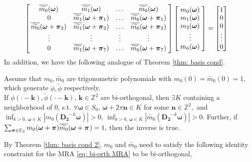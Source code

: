 \begin{align}\label{eq: LS-new}
\begin{bmatrix}
    \,\overline{\widetilde{m_{0}}}(\boldsymbol{\omega}) & \overline{\widetilde{m_{1}}}(\boldsymbol{\omega}) & \hdots & \overline{\widetilde{m_{6}}}(\boldsymbol{\omega})\;  \\
    \;0 & \overline{\widetilde{m_{1}}}(\boldsymbol{\omega} + \boldsymbol{\pi}_{1})  & \hdots  & \overline{\widetilde{m_{6}}}(\boldsymbol{\omega} + \boldsymbol{\pi}_{1})\; \\
    \,\overline{\widetilde{m_{0}}}(\boldsymbol{\omega} + \boldsymbol{\pi}_{2}) & \overline{\widetilde{m_{1}}}(\boldsymbol{\omega} + \boldsymbol{\pi}_{2}) & \hdots & \overline{\widetilde{m_{6}}}(\boldsymbol{\omega} + \boldsymbol{\pi}_{2})\;\\
    \;\vdots & \vdots & \vdots & \vdots \; \\
    \;0 & \overline{\widetilde{m_{1}}}(\boldsymbol{\omega} + \boldsymbol{\pi}_{7}) & \hdots & \overline{\widetilde{m_{6}}}(\boldsymbol{\omega} + \boldsymbol{\pi}_{7})\;
\end{bmatrix}
\begin{bmatrix}
\;m_{0}(\boldsymbol{\omega})\; \\
\;m_{1}(\boldsymbol{\omega})\; \\
\;m_{2}(\boldsymbol{\omega})\; \\
\; \vdots\; \\
\;m_{6}(\boldsymbol{\omega})\; 
\end{bmatrix} 
=
\begin{bmatrix}
1\\
0\\
0\\
\vdots \\
0
\end{bmatrix}
\end{align}
In addition, we have the following analogue of Theorem \ref{thm: basis cond}.
\begin{thm}\label{thm: basis cond 2}
Assume that $m_0, \widetilde{m_0}$ are trigonometric polynomials with $m_0(0)=\widetilde{m_0}(0) = 1$, which generate $\phi,\widetilde{\phi}$ respectively.\\
If $\phi(\cdot - \boldsymbol{k}),\widetilde{\phi}(\cdot - \boldsymbol{k}),\,\boldsymbol{k}\in\mathbb{Z}^2$ are bi-orthogonal, then $\exists K$ containing a neighborhood of 0, s.t. $\forall\boldsymbol{\omega}\in S_0,\,\boldsymbol{\omega}+2\pi\mathbf{n}\in K$ for some $\mathbf{n}\in\mathbb{Z}^2, $ and $\inf_{k>0,\,\boldsymbol{\omega}\in K}|m_0(\mathbf{D_2}^{-k}\boldsymbol{\omega})| >0$, $\inf_{k>0,\,\boldsymbol{\omega}\in K}|\widetilde{m_0}(\mathbf{D_2}^{-k}\boldsymbol{\omega})| >0$. 
 Further, if  $\sum_{\boldsymbol{\boldsymbol{\pi}}\in \Gamma_0} m_0(\boldsymbol{\omega}+\boldsymbol{\pi})\overline{\widetilde{m_{0}}}(\boldsymbol{\omega} + \boldsymbol{\pi}_{}) = 1,$ then the inverse is true.
\end{thm}
By Theorem \ref{thm: basis cond 2}, $m_0$ and $\widetilde{m_0}$ need to satisfy the following identity constraint for the MRA \eqref{eq: bi-orth MRA} to be bi-orthogonal,
